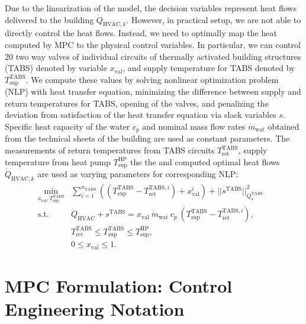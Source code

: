 \documentclass[10pt]{extarticle}
\newcommand{\lrp}[1]{\ensuremath{\left( #1 \right)}}
\begin{document}
Due to the linearization of the model, the decision variables represent heat flows delivered to the building $\dot{Q}_{\text{HVAC},k}$. However, in practical setup, we are not able to directly control the heat flows. Instead, we need to optimally map the heat computed by MPC to the physical control variables. In particular, we can control $20$ two way valves of individual circuits of thermally activated building structures (TABS) denoted by variable $x_{\text{val}}$, and supply temperature for TABS denoted by $T^{\text{TABS}}_{\text{sup}}$. We compute these values by solving nonlinear optimization problem (NLP) with heat transfer equation, minimizing the difference between supply and return temperatures for TABS, opening  of the valves, and  penalizing the deviation from satisfaction of the heat transfer equation via slack variables $s$. Specific heat capacity of the water $c_p$ and nominal mass flow rates $\dot{m}_{\text{wat}}$ obtained from the technical sheets of the building are used as constant parameters. The measurements of return temperatures from TABS circuits $T^{\text{TABS}}_{\text{ret}}$, supply temperature from heat pump $T^{\text{HP}}_{\text{sup}}$ the the  and computed optimal heat flows $\dot{Q}_{\text{HVAC},k}$ are used as varying parameters for corresponding NLP:
\begin{subequations}
\label{eq:NLP_postprocess}
\begin{align}
 \min_{x_{\text{val}}, T_{\text{sup}}^{\text{TABS}}} & \sum_{i=1}^{n_{\text{TABS}}} \lrp{(T_{\text{sup}}^{\text{TABS}} - T_{\text{ret}}^{\text{TABS},i}) + x_{\text{val}}^i } + || s^{\text{TABS}} ||_{Q^{\text{TABS}}_{\text{s}}}^2  &
 \label{eq:NLP_postprocess:cost}\\
  \text{s.t.} \ & \dot{Q}_{\text{HVAC}} + s^{\text{TABS}} = x_{\text{val}} \ \dot{m}_{\text{wat}} \ c_p \ (T_{\text{sup}}^{\text{TABS}} -  T_{\text{ret}}^{\text{TABS},i}), &  \label{eq:NLP_postprocess:heat_equation} \\
   &  T_{\text{ret}}^{\text{TABS}} \le T_{\text{sup}}^{\text{TABS}} \le T_{\text{sup}}^{\text{HP}}, \label{eq:NLP_postprocess:tsup_minmax}\\
    & 0 \le x_{\text{val}} \le 1.   \label{eq:NLP_postprocess:valve_minmax}
\end{align}
\end{subequations}

\section{MPC Formulation: Control Engineering Notation}\label{sec:control_notation}
\end{document}
